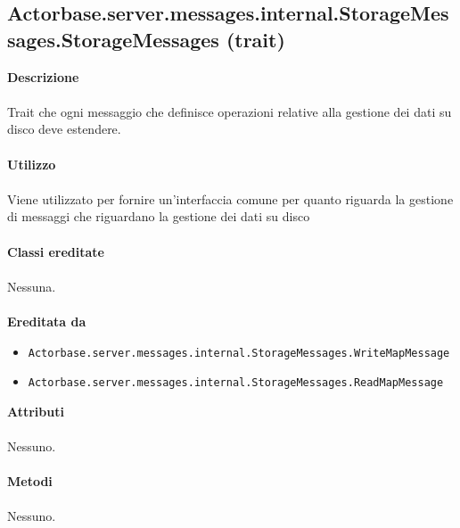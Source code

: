 \documentclass[a4paper]{article}
\begin{document}
	\subsection{Actorbase.server.messages.internal.StorageMessages.StorageMessages (trait)}
		\textbf{Descrizione}
			\\ \\
			Trait che ogni messaggio che definisce operazioni relative alla gestione dei dati su disco deve estendere.
			\\ \\
		\textbf{Utilizzo}
			\\ \\
			Viene utilizzato per fornire un'interfaccia comune per quanto riguarda la gestione di messaggi che riguardano la gestione dei dati su disco
			\\ \\
		\textbf{Classi ereditate}
			\\ \\
			Nessuna.
			\\ \\
		\textbf{Ereditata da}
			\begin{itemize}
				\item \texttt{Actorbase.server.messages.internal.StorageMessages.WriteMapMessage}
				\item \texttt{Actorbase.server.messages.internal.StorageMessages.ReadMapMessage}
			\end{itemize}
		\textbf{Attributi}
			\\ \\
			Nessuno.
			\\ \\
		\textbf{Metodi}
			\\ \\
			Nessuno.
			
\end{document}
